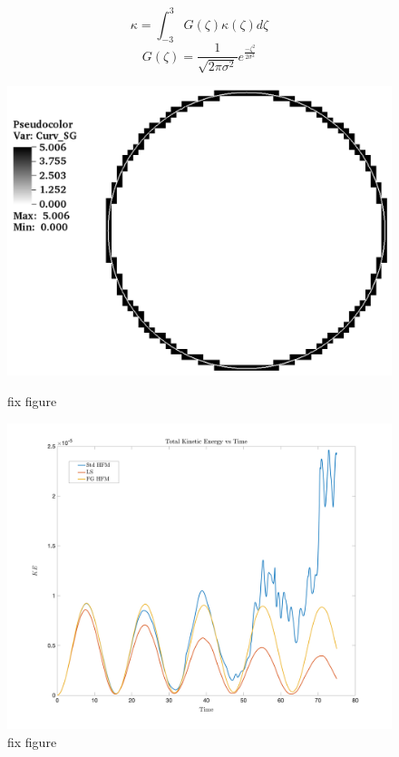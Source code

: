 \vspace{-0.2in}
\begin{equation}
\kappa = \int_{-3}^{3} G(\zeta) \kappa(\zeta) d\zeta
\label{eqn:filt}
\end{equation} 
\begin{equation}
G(\zeta) = \frac{1}{\sqrt{2 \pi \sigma^2}}e^\frac{- \zeta^2}{2\sigma^2}
\label{eqn:G}
\end{equation} 

 \begin{figure}[htbp]
	\centering
	\begin{minipage}{.5\textwidth}
		\centering
		\includegraphics[width=1.0\linewidth]{figs/curvCalc.png}
		\caption{fix figure}
		\label{fig:Gcurv}
	\end{minipage}%
	\begin{minipage}{0.5\textwidth}
		\centering
		\includegraphics[width=1.0\linewidth]{figs/KEvT}
		\caption{fix figure}
		\label{fig:GPlot}
	\end{minipage}
\end{figure}



